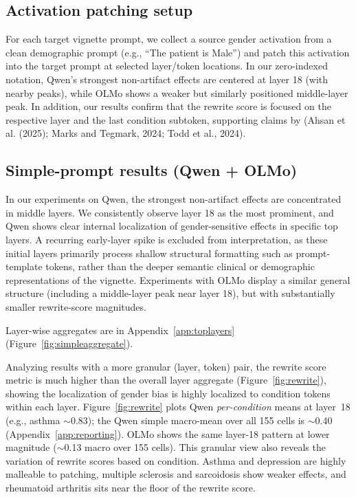 \documentclass{article}
\begin{document}
\subsection{Activation patching setup}
For each target vignette prompt, we collect a source gender activation from a clean demographic prompt (e.g., ``The patient is Male'') and patch this activation into the target prompt at selected layer/token locations. In our zero-indexed notation, Qwen's strongest non-artifact effects are centered at layer 18 (with nearby peaks), while OLMo shows a weaker but similarly positioned middle-layer peak. In addition, our results confirm that the rewrite score is focused on the respective layer and the last condition subtoken, supporting claims by (Ahsan et al. (2025); Marks and
Tegmark, 2024; Todd et al., 2024).

\subsection{Simple-prompt results (Qwen + OLMo)}
In our experiments on Qwen, the strongest non-artifact effects are concentrated in middle layers. We consistently observe layer 18 as the most prominent, and Qwen shows clear internal localization of gender-sensitive effects in specific top layers. A recurring early-layer spike is excluded from interpretation, as these initial layers primarily process shallow structural formatting such as prompt-template tokens, rather than the deeper semantic clinical or demographic representations of the vignette. Experiments with OLMo display a similar general structure (including a middle-layer peak near layer 18), but with substantially smaller rewrite-score magnitudes.

Layer-wise aggregates are in Appendix~\ref{app:toplayers} (Figure~\ref{fig:simpleaggregate}).

Analyzing results with a more granular (layer, token) pair, the rewrite score metric is much higher than the overall layer aggregate (Figure~\ref{fig:rewrite}), showing the localization of gender bias is highly localized to condition tokens within each layer. Figure~\ref{fig:rewrite} plots Qwen \emph{per-condition} means at layer~18 (e.g., asthma ${\sim}$0.83); the Qwen simple macro-mean over all 155 cells is ${\sim}$0.40 (Appendix~\ref{app:reporting}). OLMo shows the same layer-18 pattern at lower magnitude (${\sim}$0.13 macro over 155 cells). This granular view also reveals the variation of rewrite scores based on condition. Asthma and depression are highly malleable to patching, multiple sclerosis and sarcoidosis show weaker effects, and rheumatoid arthritis sits near the floor of the rewrite score.
\end{document}
